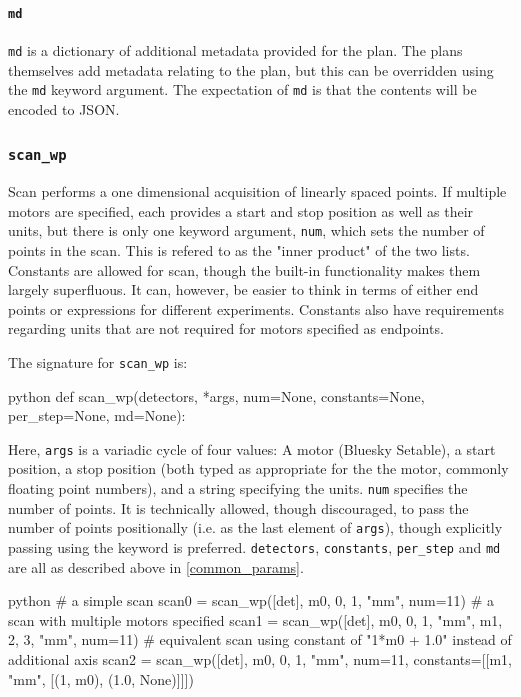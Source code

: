 \paragraph{\texttt{md}}
\texttt{md} is a dictionary of additional metadata provided for the plan.
The plans themselves add metadata relating to the plan, but this can be overridden using the \texttt{md} keyword argument.
The expectation of \texttt{md} is that the contents will be encoded to JSON.

\subsubsection{\texttt{scan\_wp}}

Scan performs a one dimensional acquisition of linearly spaced points.
If multiple motors are specified, each provides a start and stop position as well as their units, but there is only one keyword argument, \texttt{num}, which sets the number of points in the scan.
This is refered to as the "inner product" of the two lists.
Constants are allowed for scan, though the built-in functionality makes them largely superfluous.
It can, however, be easier to think in terms of either end points or expressions for different experiments.
Constants also have requirements regarding units that are not required for motors specified as endpoints.

The signature for \texttt{scan\_wp} is:

\begin{codefragment}{python}
def scan_wp(detectors, *args, num=None, constants=None, per_step=None, md=None):
\end{codefragment}

Here, \texttt{args} is a variadic cycle of four values: A motor (Bluesky Setable), a start position, a stop position (both typed as appropriate for the the motor, commonly floating point numbers), and a string specifying the units.
\texttt{num} specifies the number of points.
It is technically allowed, though discouraged, to pass the number of points positionally (i.e. as the last element of \texttt{args}), though explicitly passing using the keyword is preferred.
\texttt{detectors}, \texttt{constants}, \texttt{per\_step} and \texttt{md} are all as described above in \ref{common_params}.

\begin{codefragment}{python}
# a simple scan
scan0 = scan_wp([det], m0, 0, 1, "mm", num=11)
# a scan with multiple motors specified
scan1 = scan_wp([det], m0, 0, 1, "mm", m1, 2, 3, "mm", num=11)
# equivalent scan using constant of "1*m0 + 1.0" instead of additional axis
scan2 = scan_wp([det], m0, 0, 1, "mm", num=11,
                constants=[[m1, "mm", [(1, m0), (1.0, None)]]])
\end{codefragment}

